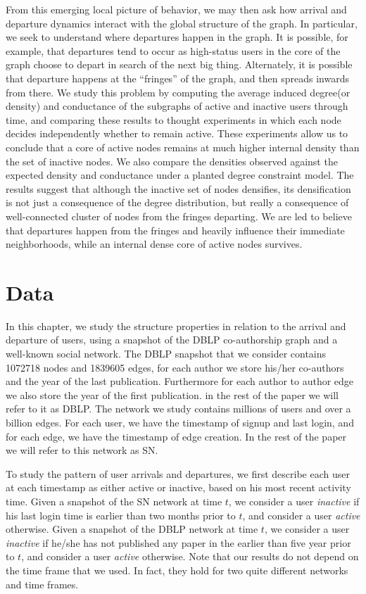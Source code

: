 \documentclass[phd,tocprelim]{cornell}
\begin{document}
From this emerging local picture of behavior, we may then ask how
arrival and departure dynamics interact with the global structure of
the graph.  In particular, we seek to understand where departures
happen in the graph.  It is possible, for example, that departures
tend to occur as high-status users in the core of the graph choose to
depart in search of the next big thing.  Alternately, it is possible
that departure happens at the ``fringes'' of the graph, and then
spreads inwards from there.  We study this problem by computing the
average induced degree(or density) and conductance of the subgraphs of active and inactive users
through time, and comparing these results to thought experiments in
which each node decides independently whether to remain active.  These
experiments allow us to conclude that a core of active nodes remains
at much higher internal density than the set of inactive nodes. We
also compare the densities observed against the expected density and
conductance under a planted degree constraint model.  The results
suggest that although the inactive set of nodes densifies, its densification is
not just a consequence of the degree distribution, but really a
consequence of well-connected cluster of nodes from the fringes
departing.  We are led to believe that departures happen from the
fringes and heavily influence their immediate neighborhoods, while
an internal dense core of active nodes survives.

\section{Data}

In this chapter, we study the structure properties in relation to the arrival and departure of users, using a snapshot
of the DBLP co-authorship graph and a well-known social network.  The DBLP snapshot
that we consider contains 1072718 nodes and 1839605 edges, for each author we store his/her co-authors
and the year of the last publication. Furthermore for each author to author edge we also
store the year of the first publication. in the rest of the paper we will refer to
it as DBLP. The network we study contains millions of
users and over a billion edges.  For each user, we have the timestamp
of signup and last login, and for each edge, we have the timestamp of
edge creation. In the rest of the paper we will refer to this network as SN.  

To study the pattern of user arrivals and departures, we first
describe each user at each timestamp as either active or inactive,
based on his most recent activity time. Given a snapshot of the SN network
at time $t$, we consider a user \emph{inactive} if his last login time
is earlier than two months prior to $t$, and consider a user
\emph{active} otherwise. Given a snapshot of the DBLP network
at time $t$, we consider a user \emph{inactive} if he/she has not published any 
paper in the earlier than five year prior to $t$, and consider a user
\emph{active} otherwise. Note that our results do not depend on the time frame that we used. In fact, they hold for two quite different networks and time frames.
\end{document}
